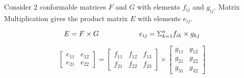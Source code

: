 \documentclass[fleqn]{beamer} %
\newcommand{\sectionIIsubsectionIItitle}{}
\newcommand{\sectionIIsubsectionIIItitle}{}
\begin{document}
			\begin{frame}
				\frametitle{\sectionIIsubsectionIItitle} \small
				\bigskip

				Consider 2 conformable matrices $F$ and $G$ with elements $f_{ij}$ and $g_{ij}$. Matrix Multiplication gives the product matrix $E$ with elements $e_{ij}$.\vspace{0mm} 
		 
		 		\[E = F \times G \hspace{20mm} e_{ij}=\Sigma_{k=1}^n f_{ik}\times g_{kj}\] 
			 
				\[
				\left[ \begin{array}{cc}
				e_{11} & e_{12}  \\
				e_{21} & e_{22}  \end{array} \right]=	 	
		 		\left[ \begin{array}{ccc}
				f_{11} & f_{12} & f_{13} \\
				f_{21} & f_{22} & f_{23} \end{array} \right] \times \left[ \begin{array}{cc}
				g_{11}&g_{12} \\
				g_{21}&g_{22} \\
				g_{31}&g_{32} \end{array} \right] 
				\]

				\btVFill 
			\end{frame}	

			\begin{frame}
				\frametitle{\sectionIIsubsectionIItitle} \small
				\bigskip

				\btVFill
			\end{frame}		


		\subsection{\sectionIIsubsectionIIItitle}\label{sectionIIsubsectionIII}
\end{document}
